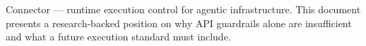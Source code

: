 \documentclass[10pt]{article}
\newcommand{\muted}[1]{\textcolor{textmuted}{#1}}
\begin{document}
\vspace{0.5em}
\noindent{\color{rule}\rule{\linewidth}{0.7pt}}
\vspace{0.3em}
{\small\muted{Connector --- runtime execution control for agentic infrastructure. This document presents a research-backed position on why API guardrails alone are insufficient and what a future execution standard must include.}}
\end{document}
